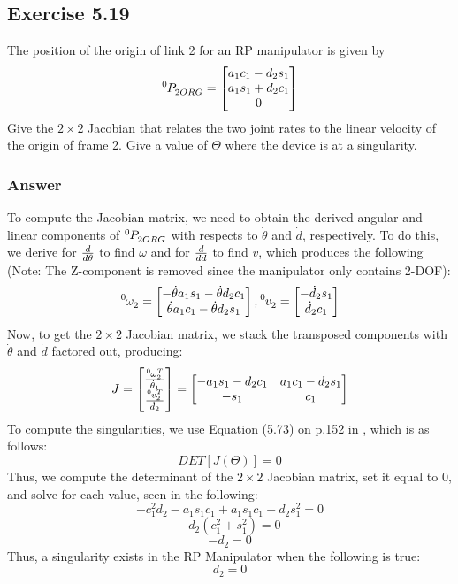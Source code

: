 \documentclass[10pt]{article}
\begin{document}
\subsection*{Exercise 5.19}
The position of the origin of link 2 for an RP manipulator is given by
\[
\tensor*[^{0}]{P}{_{2ORG}} =
\begin{bmatrix}
    a_{1}c_{1} - d_{2}s_{1}     \\
    a_{1}s_{1} + d_{2}c_{1}     \\
    0
\end{bmatrix}
\]
Give the \(2 \times 2\) Jacobian that relates the two joint rates to the linear velocity of the origin of frame {2}. Give a value of \(\Theta\) where the device is at a singularity.
\subsubsection*{Answer}
To compute the Jacobian matrix, we need to obtain the derived angular and linear components of \(\tensor*[^{0}]{P}{_{2ORG}}\) with respects to \(\dot{\theta}\) and \(\dot{d}\), respectively.  To do this, we derive for \({d}\over{d\theta}\) to find \(\omega\) and for \({d}\over{dd}\) to find \(v\), which produces the following (Note: The Z-component is removed since the manipulator only contains 2-DOF):
\[
\tensor*[^{0}]{\omega}{_{2}} =
\begin{bmatrix}
    -\dot{\theta}a_{1}s_{1} - \dot{\theta}d_{2}c_{1}     \\
    \dot{\theta}a_{1}c_{1} - \dot{\theta}d_{2}s_{1}
\end{bmatrix},
\tensor*[^{0}]{v}{_{2}} =
\begin{bmatrix}
    - \dot{d}_{2}s_{1}     \\
    \dot{d}_{2}c_{1}
\end{bmatrix}
\]
Now, to get the \(2 \times 2\) Jacobian matrix, we stack the transposed components with \(\dot{\theta}\) and \(\dot{d}\) factored out, producing:
\[
J =
\begin{bmatrix}
    \tensor*[^{0}]{\omega}{^{T}_{2}}  \over {\dot{\theta}_{1}}   \\
    \tensor*[^{0}]{v}{^{T}_{2}} \over \dot{d}_{2}
\end{bmatrix} =
\begin{bmatrix}
    -a_{1}s_{1} - d_{2}c_{1} &  a_{1}c_{1} - d_{2}s_{1}  \\
    -s_{1} 					 & c_{1}
\end{bmatrix}
\]
To compute the singularities, we use Equation (5.73) on p.152 in \cite{textbook}, which is as follows:
\[DET[J(\Theta)] = 0\]
Thus, we compute the determinant of the \(2 \times 2\) Jacobian matrix, set it equal to 0, and solve for each value, seen in the following:
\[
-c_{1}^2d_{2} - a_{1}s_{1}c_{1} + a_{1}s_{1}c_{1} - d_{2}s_{1}^2 = 0
\]
\[
-d_{2}(c_{1}^2 + s_{1}^2) = 0
\]
\[
-d_{2} = 0
\]
Thus, a singularity exists in the RP Manipulator when the following is true:
\[
d_{2} = 0
\]
\pagebreak
\end{document}

